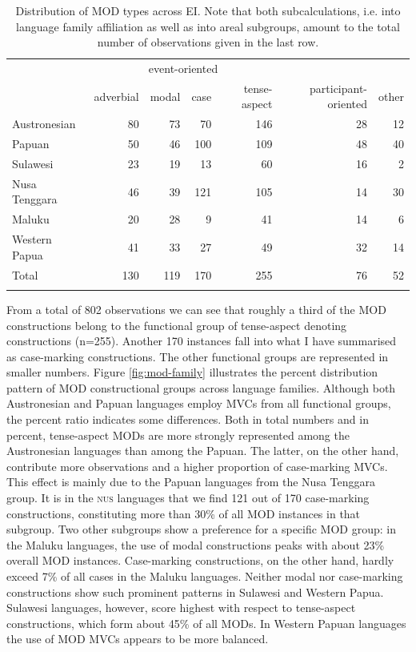\begin{table}
\begin{tabular}{lrrrr|rr}
  \lsptoprule
& \multicolumn{4}{c}{event-oriented} & & \\
 & {adverbial} & {modal} & {case} & {tense-aspect} & {participant-oriented} & {other}\\  
  \midrule
  Austronesian & 80 & 73 & 70 & 146 & 28 & 12 \tabularnewline
  Papuan & 50 & 46 & 100 & 109 & 48 & 40 \tabularnewline
   \midrule
  Sulawesi & 23 & 19 & 13 & 60 & 16 & 2 \tabularnewline
  Nusa Tenggara & 46 & 39 & 121 & 105 & 14 & 30 \tabularnewline
  Maluku & 20 & 28 & 9 & 41 & 14 & 6 \tabularnewline 
  Western Papua & 41 & 33 & 27 & 49 & 32 & 14 \tabularnewline 
\midrule
Total & 130 & 119 & 170 & 255 & 76 & 52 \tabularnewline
\lspbottomrule
\end{tabular}
\caption[Distribution of MOD types across EI]{Distribution of MOD types across EI. Note that both subcalculations, i.e. into language family affiliation as well as into areal subgroups,  amount to the total number of observations given in the last row.}
\label{table:MOD_overview}
\end{table}

From a total of 802 observations we can see that roughly a third of the MOD constructions belong to the functional group of tense-aspect denoting constructions (n=255). Another 170 instances fall into what I have summarised as case-marking constructions. The other functional groups are represented in smaller numbers. Figure \ref{fig:mod-family} illustrates the percent distribution pattern of MOD constructional groups across language families. Although both Austronesian and Papuan languages employ MVCs from all functional groups, the percent ratio indicates some differences. Both in total numbers and in percent, tense-aspect MODs are more strongly represented among the Austronesian languages than among the Papuan. The latter, on the other hand, contribute more observations and a higher proportion of case-marking MVCs. This effect is mainly due to the Papuan languages from the Nusa Tenggara group. It is in the \textsc{nus} languages that we find 121 out of 170 case-marking constructions, constituting more than 30\% of all MOD instances in that subgroup. Two other subgroups show a preference for a specific MOD group: in the Maluku languages, the use of modal constructions peaks with about 23\% overall MOD instances. Case-marking constructions, on the other hand, hardly exceed 7\% of all cases in the Maluku languages. Neither modal nor case-marking constructions show such prominent patterns in Sulawesi and Western Papua. Sulawesi languages, however, score highest with respect to tense-aspect constructions, which form about 45\% of all MODs. In Western Papuan languages the use of MOD MVCs appears to be more balanced.

